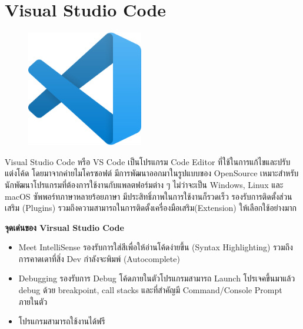 \section{Visual Studio Code}
\label{Visual Studio Code}
\begin{figure}[!thb]
	\captionsetup{justification=centering}
	\centering
	\includegraphics[width=2in]{figures/vscode.png}
	\label{fig:vscode}
\end{figure}
Visual Studio Code หรือ  VS Code เป็นโปรแกรม  Code Editor ที่ใช้ในการแก้ไขและปรับแต่งโค้ด โดยมาจากค่ายไมโครซอฟต์ มีการพัฒนาออกมาในรูปแบบของ OpenSource เหมาะสำหรับนักพัฒนาโปรแกรมที่ต้องการใช้งานกับแพลตฟอร์มต่าง ๆ ไม่ว่าจะเป็น  Windows, Linux และ macOS   ซัพพอร์ทภาษาหลายร้อยภาษา มีประสิทธิ์ภาพในการใช้งานก็รวดเร็ว รองรับการติดตั้งส่วนเสริม (Plugins) รวมถึงความสามารถในการติดตั้งเครื่องมือเสริม(Extension) ให้เลือกใช้อย่างมาก 

\begin{flushleft}
	\textbf{จุดเด่นของ Virsual Studio Code}
\end{flushleft}
\begin{itemize}
	\item Meet IntelliSense รองรับการใส่สีเพื่อให้อ่านโค้ดง่ายขึ้น (Syntax Highlighting) รวมถึงการคาดเดาที่สิ่ง Dev กำลังจะพิมพ์ (Autocomplete)
	\item Debugging รองรับการ Debug โค้ดภายในตัวโปรแกรมสามารถ Launch โปรเจคขึ้นมาแล้ว debug ด้วย breakpoint, call stacks และที่สำคัญมี Command/Console Prompt ภายในตัว
	\item โปรแกรมสามารถใช้งานได้ฟรี
\end{itemize}
\newpage


